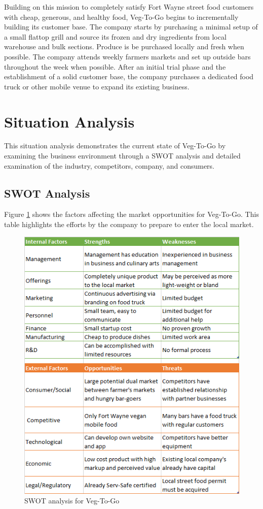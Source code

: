 \documentclass[12pt, letterpaper]{article}
\newcommand{\companyname}{Veg-To-Go}
\begin{document}
Building on this mission to completely satisfy Fort Wayne street food customers with cheap, generous, and healthy food, Veg-To-Go begins to incrementally building its customer base.  The company starts by purchasing a minimal setup of a small flattop grill and source its frozen and dry ingredients from local warehouse and bulk sections. Produce is be purchased locally and fresh when possible.  The company attends weekly farmers markets and set up outside bars throughout the week when possible.  After an initial trial phase and the establishment of a solid customer base, the company purchases a dedicated food truck or other mobile venue to expand its existing business.

\section{Situation Analysis}
This situation analysis demonstrates the current state of \companyname{} by examining the business environment through a SWOT analysis and detailed examination of the industry, competitors, company, and consumers.

\subsection{SWOT Analysis}
Figure \ref{SWOT} shows the factors affecting the market opportunities for \companyname{}.  This table highlights the efforts by the company to prepare to enter the local market.

\begin{figure}[H]
	\label{SWOT}
	\caption{SWOT analysis for \companyname{}}
	\centering
	\includegraphics{SWOT}
\end{figure}
\end{document}
